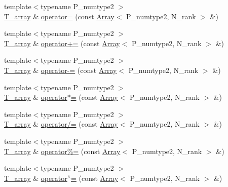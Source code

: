\begin{DoxyCompactItemize}
\item 
{\footnotesize template$<$typename P\+\_\+numtype2 $>$ }\\\hyperlink{classArray_a6a3d9b6a214107a10df219091801f1e0}{T\+\_\+array} \& \hyperlink{classArray_a901f1127038e427e99dae6ba6a97f36f}{operator=} (const \hyperlink{classArray}{Array}$<$ P\+\_\+numtype2, N\+\_\+rank $>$ \&)
\item 
{\footnotesize template$<$typename P\+\_\+numtype2 $>$ }\\\hyperlink{classArray_a6a3d9b6a214107a10df219091801f1e0}{T\+\_\+array} \& \hyperlink{classArray_a1af2170ae264010430ebd7e5ac4f0b80}{operator+=} (const \hyperlink{classArray}{Array}$<$ P\+\_\+numtype2, N\+\_\+rank $>$ \&)
\item 
{\footnotesize template$<$typename P\+\_\+numtype2 $>$ }\\\hyperlink{classArray_a6a3d9b6a214107a10df219091801f1e0}{T\+\_\+array} \& \hyperlink{classArray_aea5e890791a67e292967cd69a1c29ae1}{operator-\/=} (const \hyperlink{classArray}{Array}$<$ P\+\_\+numtype2, N\+\_\+rank $>$ \&)
\item 
{\footnotesize template$<$typename P\+\_\+numtype2 $>$ }\\\hyperlink{classArray_a6a3d9b6a214107a10df219091801f1e0}{T\+\_\+array} \& \hyperlink{classArray_afda7e473a36f9262fac0a32c4df9d65a}{operator$\ast$=} (const \hyperlink{classArray}{Array}$<$ P\+\_\+numtype2, N\+\_\+rank $>$ \&)
\item 
{\footnotesize template$<$typename P\+\_\+numtype2 $>$ }\\\hyperlink{classArray_a6a3d9b6a214107a10df219091801f1e0}{T\+\_\+array} \& \hyperlink{classArray_a241827325dfbd647ddf9720d49a81724}{operator/=} (const \hyperlink{classArray}{Array}$<$ P\+\_\+numtype2, N\+\_\+rank $>$ \&)
\item 
{\footnotesize template$<$typename P\+\_\+numtype2 $>$ }\\\hyperlink{classArray_a6a3d9b6a214107a10df219091801f1e0}{T\+\_\+array} \& \hyperlink{classArray_ad7c9c9d0c0ebb1a0aa6450411acf16ff}{operator\%=} (const \hyperlink{classArray}{Array}$<$ P\+\_\+numtype2, N\+\_\+rank $>$ \&)
\item 
{\footnotesize template$<$typename P\+\_\+numtype2 $>$ }\\\hyperlink{classArray_a6a3d9b6a214107a10df219091801f1e0}{T\+\_\+array} \& \hyperlink{classArray_a54bd9f8179f7ac8dcb389e0f698c6784}{operator$^\wedge$=} (const \hyperlink{classArray}{Array}$<$ P\+\_\+numtype2, N\+\_\+rank $>$ \&)
\item 

\end{DoxyCompactItemize}
